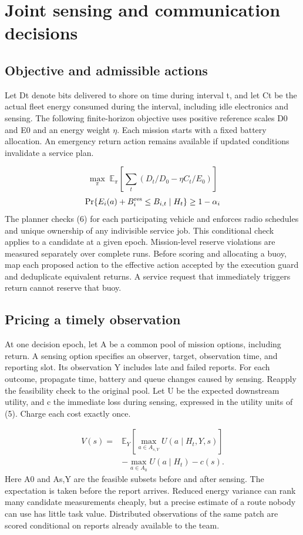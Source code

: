 \documentclass[journal]{IEEEtran}
\begin{document}
\section{Joint sensing and communication decisions}
\subsection{Objective and admissible actions}
Let Dt denote bits delivered to shore on time during interval t, and let Ct be the actual fleet energy consumed during the interval, including idle electronics and sensing. The following finite-horizon objective uses positive reference scales D0 and E0 and an energy weight $\eta$. Each mission starts with a fixed battery allocation. An emergency return action remains available if updated conditions invalidate a service plan.

\begin{equation}\max_{\pi}\;\mathbb E_{\pi}\!\left[\sum_t(D_t/D_0-\eta C_t/E_0)\right]\end{equation}
\begin{equation}\Pr\{E_i(a)+B_i^{\rm res}\le B_{i,t}\mid H_t\}\ge 1-\alpha_i\end{equation}
The planner checks (6) for each participating vehicle and enforces radio schedules and unique ownership of any indivisible service job. This conditional check applies to a candidate at a given epoch. Mission-level reserve violations are measured separately over complete runs. Before scoring and allocating a buoy, map each proposed action to the effective action accepted by the execution guard and deduplicate equivalent returns. A service request that immediately triggers return cannot reserve that buoy.

\subsection{Pricing a timely observation}
At one decision epoch, let A be a common pool of mission options, including return. A sensing option specifies an observer, target, observation time, and reporting slot. Its observation Y includes late and failed reports. For each outcome, propagate time, battery and queue changes caused by sensing. Reapply the feasibility check to the original pool. Let U be the expected downstream utility, and c the immediate loss during sensing, expressed in the utility units of (5). Charge each cost exactly once.

\begin{equation}\begin{aligned}V(s)={}&\mathbb E_Y[\max_{a\in A_{s,Y}}U(a\mid H_t,Y,s)]\\&-\max_{a\in A_0}U(a\mid H_t)-c(s).\end{aligned}\end{equation}
Here A0 and As,Y are the feasible subsets before and after sensing. The expectation is taken before the report arrives. Reduced energy variance can rank many candidate measurements cheaply, but a precise estimate of a route nobody can use has little task value. Distributed observations of the same patch are scored conditional on reports already available to the team.
\end{document}
